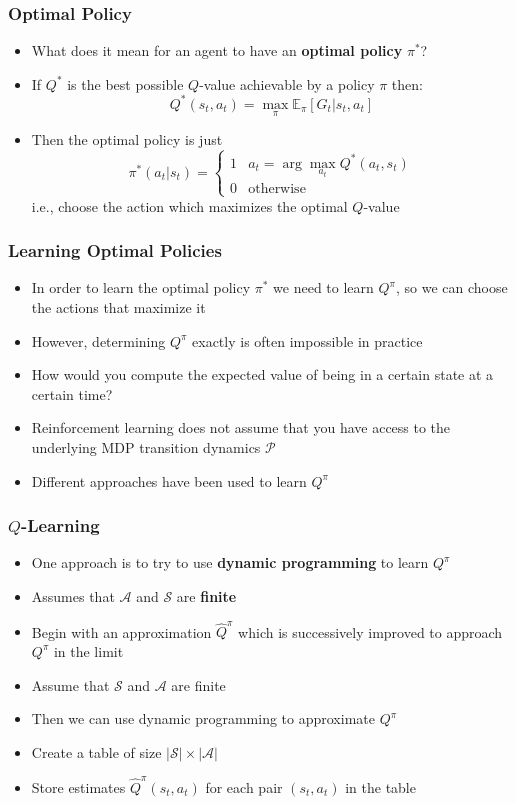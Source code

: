 \documentclass{beamer}
\begin{document}
\begin{frame}
  \frametitle{Optimal Policy}
  \begin{itemize}
    \item What does it mean for an agent to have an \textbf{optimal policy} $\pi^*$?
    \item If $Q^*$ is the best possible $Q$-value achievable by a policy $\pi$ then: $$Q^*(s_t, a_t) = \max_{\pi} \mathbb{E}_\pi \left[ G_t \vert s_t, a_t \right]$$
    \item Then the optimal policy is just
    $$\pi^* (a_t \vert s_t) = \begin{cases} 1 & a_t = \arg \max_{a_t} Q^*(a_t, s_t)\\ 0 & \text{otherwise} \end{cases}$$
    i.e., choose the action which maximizes the optimal $Q$-value
  \end{itemize}
\end{frame}

\begin{frame}
  \frametitle{Learning Optimal Policies}
  \begin{itemize}
    \item In order to learn the optimal policy $\pi^*$ we need to learn $Q^\pi$, so we can choose the actions that maximize it
    \item However, determining $Q^\pi$ exactly is often impossible in practice
    \item How would you compute the expected value of being in a certain state at a certain time?
    \item Reinforcement learning does not assume that you have access to the underlying MDP transition dynamics $\mathcal{P}$
    \item Different approaches have been used to learn $Q^\pi$
  \end{itemize}
\end{frame}

\begin{frame}
  \frametitle{$Q$-Learning}
  \begin{itemize}
    \item One approach is to try to use \textbf{dynamic programming} to learn $Q^\pi$
    \item Assumes that $\mathcal{A}$ and $\mathcal{S}$ are \textbf{finite}
    \item Begin with an approximation $\widehat{Q}^\pi$ which is successively improved to approach $Q^\pi$ in the limit
    \item Assume that $\mathcal{S}$ and $\mathcal{A}$ are finite
    \item Then we can use dynamic programming to approximate $Q^\pi$
    \item Create a table of size $\lvert \mathcal{S} \rvert \times \lvert \mathcal{A} \rvert$
    \item Store estimates $\widehat{Q}^\pi(s_t, a_t)$ for each pair $(s_t, a_t)$ in the table
  \end{itemize}
\end{frame}
\end{document}
